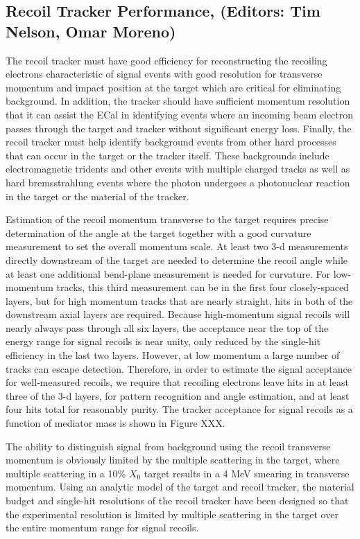 \subsection{Recoil Tracker Performance, (Editors: Tim Nelson, Omar Moreno)}

The recoil tracker must have good efficiency for reconstructing the recoiling electrons characteristic of signal events with good resolution for transverse momentum and impact position at the target which are critical for eliminating background. In addition, the tracker should have sufficient momentum resolution that it can assist the ECal in identifying events where an incoming beam electron passes through the target and tracker without significant energy loss. Finally, the recoil tracker must help identify background events from other hard processes that can occur in the target or the tracker itself. These backgrounds include electromagnetic tridents and other events with multiple charged tracks as well as hard bremsstrahlung events where the photon undergoes a photonuclear reaction in the target or the material of the tracker.  

Estimation of the recoil momentum transverse to the target requires precise determination of the angle at the target together with a good curvature measurement to set the overall momentum scale.  At least two 3-d measurements directly downstream of the target are needed to determine the recoil angle while at least one additional bend-plane measurement is needed for curvature.  For low-momentum tracks, this third measurement can be in the first four closely-spaced layers, but for high momentum tracks that are nearly straight, hits in both of the downstream axial layers are required.  Because high-momentum signal recoils will nearly always pass through all six layers, the acceptance near the top of the energy range for signal recoils is near unity, only reduced by the single-hit efficiency in the last two layers. However, at low momentum a large number of tracks can escape detection. Therefore, in order to estimate the signal acceptance for well-measured recoils, we require that recoiling electrons leave hits in at least three of the 3-d layers, for pattern recognition and angle estimation, and at least four hits total for reasonably purity.  The tracker acceptance for signal recoils as a function of mediator mass is shown in Figure XXX.

The ability to distinguish signal from background using the recoil transverse momentum is obviously limited by the multiple scattering in the target, where multiple scattering in a 10\% $X_0$ target results in a 4 MeV smearing in transverse momentum.  Using an analytic model of the target and recoil tracker, the material budget and single-hit resolutions of the recoil tracker have been designed so that the experimental resolution is limited by multiple scattering in the target over the entire momentum range for signal recoils.











